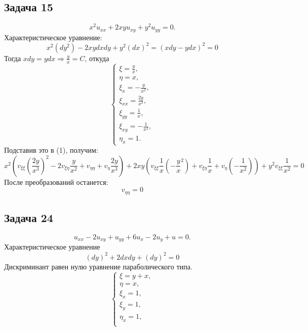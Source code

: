 \documentclass[11pt]{article}
\begin{document}
\subsection{Задача 15}
\label{sec:org12dc60f}
\begin{equation}
x^2u_{xx} + 2xyu_{xy} + y^2u_{yy} = 0.
\end{equation}
Характеристическое уравнение:
\begin{equation}
x^2(dy^2) - 2xydxdy + y^2(dx)^2 = (xdy - ydx)^2 = 0
\end{equation}
Тогда $xdy = ydx \Rightarrow \frac{y}x = C$, откуда
\begin{equation}
\begin{cases}
\xi = \frac{y}x, \\
\eta = x, \\
\xi_x = -\frac{y}{x^2}, \\
\xi_{xx} = \frac{2y}{x^3}, \\
\xi_{yy} = \frac1x, \\
\xi_{xy} = -\frac1{x^2}, \\
\eta_x = 1.
\end{cases}
\end{equation}
Подставив это в (1), получим:
\begin{equation}
x^2\left(v_{\xi\xi}\left(\frac{2y}{x^3}\right)^2 - 2v_{\xi\eta}\frac{y}{x^2} + v_{\eta\eta} + v_{\eta}\frac{2y}{x^3}\right) +
2xy\left(v_{\xi\xi}\frac1x\left(-\frac{y}x^2\right) + v_{\xi\eta}\frac1x + v_{\eta}\left(-\frac1{x^2}\right)\right) +
y^2v_{\xi\xi}\frac1{x^2} = 0
\end{equation}
После преобразований останется:
\begin{equation}
v_{\eta\eta} = 0
\end{equation}
\subsection{Задача 24}
\label{sec:org18acbde}
\begin{equation}
u_{xx} - 2u_{xy} + u_{yy} + 6u_x - 2u_y + u = 0.
\end{equation}
Характеристическое уравнение
\begin{equation}
(dy)^2 + 2dxdy + (dy)^2 = 0
\end{equation}
Дискриминант равен нулю \Rightarrow уравнение параболического типа.
\begin{equation}
\begin{cases}
\xi = y + x, \\
\eta = x, \\
\xi_x = 1, \\
\xi_y = 1, \\
\eta_x = 1, \\
\end{cases}
\end{equation}
\end{document}
